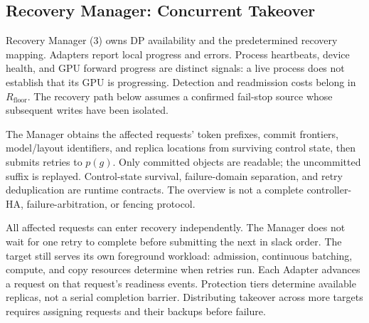\subsection{Recovery Manager: Concurrent Takeover}
\label{sec:parallel-recovery}

Recovery Manager (3) owns DP availability and the predetermined recovery
mapping. Adapters report local progress and errors. Process heartbeats,
device health, and GPU forward progress are distinct signals: a live
process does not establish that its GPU is progressing. Detection and
readmission costs belong in $R_{\mathrm{floor}}$.
The recovery path below assumes a confirmed fail-stop source whose
subsequent writes have been isolated.

The Manager obtains the affected requests' token prefixes, commit
frontiers, model/layout identifiers, and replica locations from surviving
control state, then submits retries to $p(g)$. Only committed objects
are readable; the uncommitted suffix is replayed. Control-state survival,
failure-domain separation, and retry deduplication are runtime contracts.
The overview is not a complete controller-HA, failure-arbitration, or
fencing protocol.

All affected requests can enter recovery independently. The Manager does
not wait for one retry to complete before submitting the next in slack
order. The target still serves its own foreground workload: admission,
continuous batching, compute, and copy resources determine when retries
run. Each Adapter advances a request on that request's readiness events.
Protection tiers determine available replicas, not a serial completion
barrier. Distributing takeover across more targets requires assigning
requests and their backups before failure.
